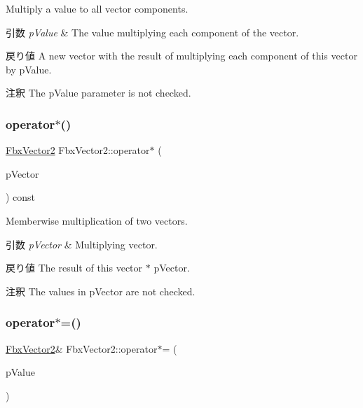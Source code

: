 Multiply a value to all vector components. 
\begin{DoxyParams}{引数}
{\em p\+Value} & The value multiplying each component of the vector. \\
\hline
\end{DoxyParams}
\begin{DoxyReturn}{戻り値}
A new vector with the result of multiplying each component of this vector by p\+Value. 
\end{DoxyReturn}
\begin{DoxyRemark}{注釈}
The p\+Value parameter is not checked. 
\end{DoxyRemark}
\mbox{\label{class_fbx_vector2_a23e549f48d5149cab64d2704bc559662}} 
\subsubsection{\texorpdfstring{operator$\ast$()}{operator*()}\hspace{0.1cm}{\footnotesize\ttfamily [2/2]}}
{\footnotesize\ttfamily \hyperlink{class_fbx_vector2}{Fbx\+Vector2} Fbx\+Vector2\+::operator$\ast$ (\begin{DoxyParamCaption}\item[{const \hyperlink{class_fbx_vector2}{Fbx\+Vector2} \&}]{p\+Vector }\end{DoxyParamCaption}) const}

Memberwise multiplication of two vectors. 
\begin{DoxyParams}{引数}
{\em p\+Vector} & Multiplying vector. \\
\hline
\end{DoxyParams}
\begin{DoxyReturn}{戻り値}
The result of this vector $\ast$ p\+Vector. 
\end{DoxyReturn}
\begin{DoxyRemark}{注釈}
The values in p\+Vector are not checked. 
\end{DoxyRemark}
\mbox{\label{class_fbx_vector2_adb53657fc2234707125a69fa8e8c55e1}} 
\subsubsection{\texorpdfstring{operator$\ast$=()}{operator*=()}\hspace{0.1cm}{\footnotesize\ttfamily [1/2]}}
{\footnotesize\ttfamily \hyperlink{class_fbx_vector2}{Fbx\+Vector2}\& Fbx\+Vector2\+::operator$\ast$= (\begin{DoxyParamCaption}\item[{double}]{p\+Value }\end{DoxyParamCaption})}

